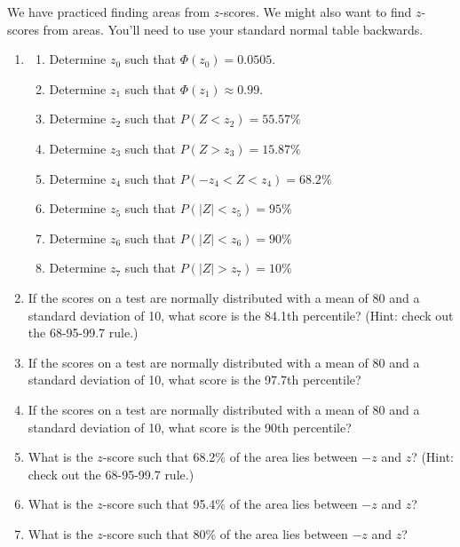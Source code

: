 \documentclass[12pt,letterpaper]{article}
\begin{document}
\newpage
\noindent We have practiced finding areas from $z$-scores. We might also want to find $z$-scores from areas. You'll need to use your standard normal table backwards.
\begin{enumerate}[resume]
\item \begin{enumerate}
\item Determine $z_0$ such that $\Phi(z_0)=0.0505$.
\vfill
\item Determine $z_1$ such that $\Phi(z_1)\approx 0.99$.
\vfill
\item Determine $z_2$ such that $P(Z < z_2) = 55.57\%$
\vfill
\item Determine $z_3$ such that $P(Z > z_3) = 15.87\%$
\vfill
\item Determine $z_4$ such that $P(-z_4 < Z < z_4) = 68.2\%$
\vfill
\item Determine $z_5$ such that $P(|Z| < z_5) = 95\%$
\vfill
\item Determine $z_6$ such that $P(|Z| < z_6) = 90\%$
\vfill
\item Determine $z_7$ such that $P(|Z| > z_7) = 10\%$
\vfill
\end{enumerate}

\newpage
\item If the scores on a test are normally distributed with a mean of 80 and a standard deviation of 10, what score is the 84.1th percentile? (Hint: check out the 68-95-99.7 rule.)
\vfill
\item If the scores on a test are normally distributed with a mean of 80 and a standard deviation of 10, what score is the 97.7th percentile?
\vfill
\item If the scores on a test are normally distributed with a mean of 80 and a standard deviation of 10, what score is the 90th percentile?
\vfill
\item What is the $z$-score such that 68.2\% of the area lies between $-z$ and $z$? (Hint: check out the 68-95-99.7 rule.)
\vfill
\item What is the $z$-score such that 95.4\% of the area lies between $-z$ and $z$?
\vfill
\item What is the $z$-score such that 80\% of the area lies between $-z$ and $z$?
\vfill


\end{enumerate}
\newpage
\end{document}
